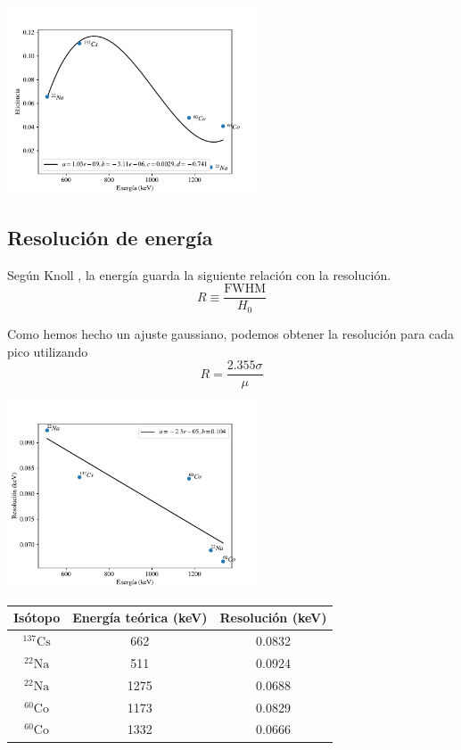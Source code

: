 \documentclass[a4paper, onecolumn]{article}
\begin{document}
		\begin{center}
			\includegraphics[width=210pt]{img/bgo_efficiency.pdf}
		\end{center}

		\subsection{Resolución de energía}

		Según Knoll \cite{knoll_radiation_2010}, la energía guarda la siguiente relación con la resolución.
		$$
		R \equiv \frac{\mathrm{FWHM}}{H_0}
		$$

		Como hemos hecho un ajuste gaussiano, podemos obtener la resolución para cada pico utilizando
		$$
		R = \frac{2.355\sigma}{\mu}
		$$

		\begin{center}
			\includegraphics[width=210pt]{img/resolution_vs_energy.pdf}
		\end{center}

		\begin{center}
			{\renewcommand{\arraystretch}{1.5}
			\renewcommand{\tabcolsep}{0.2cm}
			\label{table_energy_resolution}
			\begin{tabular}{ c c c  }
				\hline
				Isótopo & Energía teórica (keV) & Resolución (keV) \\
				\hline
				${}^{137}\mathrm{Cs}$ & 662 & 0.0832\\ 
				${}^{22}\mathrm{Na}$  & 511 & 0.0924\\ 
				${}^{22}\mathrm{Na}$  & 1275 & 0.0688 \\ 
				${}^{60}\mathrm{Co}$ & 1173 & 0.0829 \\ 
				${}^{60}\mathrm{Co}$  & 1332 & 0.0666
			\end{tabular}}
		\end{center}
\end{document}
